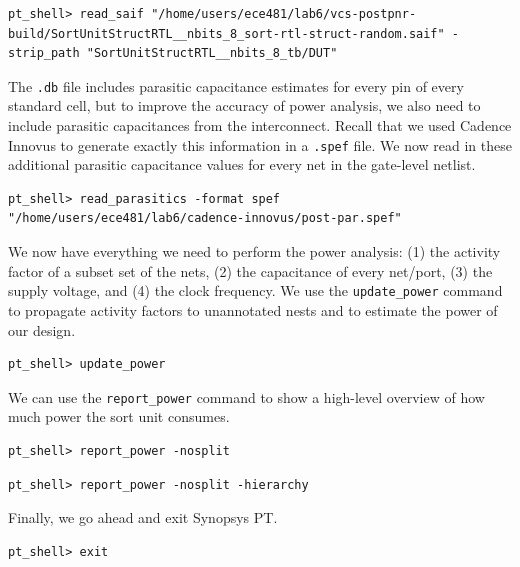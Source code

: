 \documentclass[a4paper,12pt,twoside]{article}
\begin{document}
\begin{verbatim}
pt_shell> read_saif "/home/users/ece481/lab6/vcs-postpnr-build/SortUnitStructRTL__nbits_8_sort-rtl-struct-random.saif" -strip_path "SortUnitStructRTL__nbits_8_tb/DUT"
\end{verbatim}
The \texttt{.db} file includes parasitic capacitance estimates for every pin of every standard cell, but to improve the accuracy of power analysis, we also need to include parasitic capacitances from the interconnect. Recall that we used Cadence Innovus to generate exactly this information in a \texttt{.spef} file. We now read in these additional parasitic capacitance values for every net in the gate-level netlist.
\begin{verbatim}
pt_shell> read_parasitics -format spef "/home/users/ece481/lab6/cadence-innovus/post-par.spef"
\end{verbatim}
We now have everything we need to perform the power analysis: (1) the activity factor of a subset set of the nets, (2) the capacitance of every net/port, (3) the supply voltage, and (4) the clock frequency. We use the \texttt{update\_power} command to propagate activity factors to unannotated nests and to estimate the power of our design.
\begin{verbatim}
pt_shell> update_power
\end{verbatim}
We can use the \texttt{report\_power} command to show a high-level overview of how much power the sort unit consumes.
\begin{verbatim}
pt_shell> report_power -nosplit
\end{verbatim}
\begin{verbatim}
pt_shell> report_power -nosplit -hierarchy
\end{verbatim}
Finally, we go ahead and exit Synopsys PT.
\begin{verbatim}
pt_shell> exit
\end{verbatim}

\newpage
\end{document}
